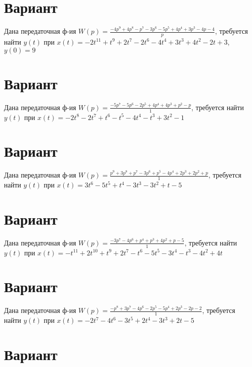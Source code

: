 \documentclass{article}
\begin{document}
\section{Вариант}

Дана передаточная ф-ия $W(p)=\frac{-4p^{9}+4p^{8}-p^{7}-3p^{6}-5p^{5}+4p^{4}+3p^{3}-4p-4}{p}$, требуется найти $y(t)$ при $x(t)=-2t^{11}+t^{9}+2t^{7}-2t^{6}-4t^{4}+3t^{3}+4t^{2}-2t+3$, $y(0)=9$



\section{Вариант}

Дана передаточная ф-ия $W(p)=\frac{-5p^{7}-5p^{6}-2p^{5}+4p^{4}+4p^{3}+p^{2}-p}{1}$, требуется найти $y(t)$ при $x(t)=-2t^{8}-2t^{7}+t^{6}-t^{5}-4t^{4}-t^{3}+3t^{2}-1$



\section{Вариант}

Дана передаточная ф-ия $W(p)=\frac{p^{9}+3p^{8}+p^{7}-3p^{6}+p^{5}-4p^{4}+2p^{3}+2p^{2}+p}{1}$, требуется найти $y(t)$ при $x(t)=3t^{6}-5t^{5}+t^{4}-3t^{3}-3t^{2}+t-5$



\section{Вариант}

Дана передаточная ф-ия $W(p)=\frac{-3p^{7}-4p^{6}+p^{4}+p^{3}+4p^{2}+p-5}{1}$, требуется найти $y(t)$ при $x(t)=-t^{11}+2t^{10}+t^{9}+2t^{7}-t^{6}-5t^{5}-3t^{4}-t^{3}-4t^{2}+4t$



\section{Вариант}

Дана передаточная ф-ия $W(p)=\frac{-p^{8}+3p^{7}-4p^{6}-2p^{5}-5p^{4}+2p^{3}-2p-2}{1}$, требуется найти $y(t)$ при $x(t)=-2t^{7}-4t^{6}-3t^{5}+2t^{4}-3t^{3}+2t-5$



\section{Вариант}
\end{document}
